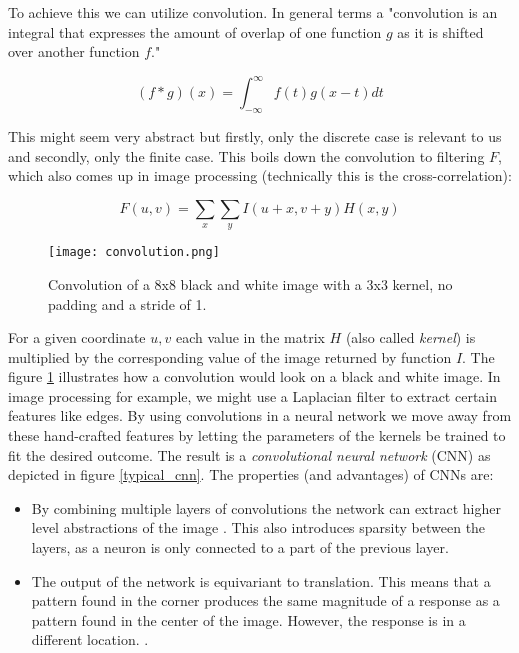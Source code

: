 To achieve this we can utilize convolution. In general terms a "convolution is an integral that expresses the amount of overlap of one function $g$ as it is shifted over another function $f$." \cite{weisstein_convolution_nodate}

$$
    (f * g)(x) = \int_{-\infty}^{\infty} f(t)g(x - t) dt
$$

This might seem very abstract but firstly, only the discrete case is relevant to us and secondly, only the finite case. This boils down the convolution to filtering $F$, which also comes up in image processing (technically this is the cross-correlation):

$$
    F(u, v) = \sum_{x} \sum_{y} I(u+x, v+y)H(x, y)
$$

\begin{figure}
    \centering
    \texttt{[image: convolution.png]}
    \caption{Convolution of a 8x8 black and white image with a 3x3 kernel, no padding and a stride of 1. \cite[cf. p. 13]{bruasdal_deep_2020}}
    \label{convolution}
\end{figure}

For a given coordinate $u,v$ each value in the matrix $H$ (also called \textit{kernel}) is multiplied by the  corresponding value of the image returned by function $I$. The figure \ref{convolution} illustrates how a convolution would look on a black and white image. In image processing for example, we might use a Laplacian filter to extract certain features like edges. By using convolutions in a neural network we move away from these hand-crafted features by letting the parameters of the kernels be trained to fit the desired outcome. The result is a \textit{convolutional neural network} (CNN) as depicted in figure \ref{typical_cnn}. The properties (and advantages) of CNNs are:

\begin{itemize}
    \item By combining multiple layers of convolutions the network can extract higher level abstractions of the image \cite{ilin_abstraction_2017}. This also introduces sparsity between the layers, as a neuron is only connected to a part of the previous layer.
    \item The output of the network is equivariant to translation. This means that a pattern found in the corner produces the same magnitude of a response as a pattern found in the center of the image. However, the response is in a different location. \cite{208949}.
\end{itemize}

